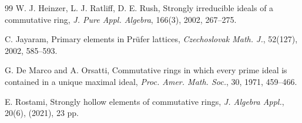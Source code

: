 \documentclass[11pt,english]{amsart}
\theoremstyle{definition}
\numberwithin{equation}{section}
\theoremstyle{remark}
\begin{document}
\begin{thebibliography}{99}
		W. J. Heinzer, L. J. Ratliff, D. E. Rush, Strongly irreducible ideals of a commutative ring,  \emph{J. Pure Appl. Algebra}, 166(3), 2002, 267--275.
		
		 C. Jayaram,  Primary elements in Prüfer lattices, \emph{Czechoslovak Math. J.}, 52(127), 2002, 585--593.
		
		
		G. De Marco and A. Orsatti,  Commutative rings in which every prime ideal is contained in a unique maximal ideal, \emph{Proc. Amer. Math. Soc.}, 30, 1971, 459--466.
		
		E. Rostami, Strongly hollow elements of commutative rings, \textit{J. Algebra Appl.},  20(6), (2021), 23 pp.
	\end{thebibliography}
\end{document}
